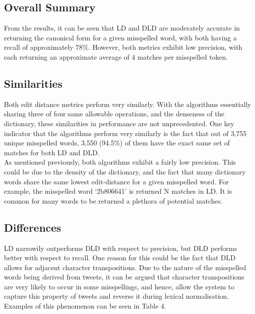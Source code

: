 \documentclass[11pt]{article}
\begin{document}


\subsection{Overall Summary}
From the results, it can be seen that LD and DLD are moderately accurate in returning the canonical form for a given misspelled word, with both having a recall of approximately 78\%. However, both metrics exhibit low precision, with each returning an approximate average of 4 matches per misspelled token.


\subsection{Similarities}
Both edit distance metrics perform very similarly. With the algorithms essentially sharing three of four same allowable operations, and the denseness of the dictionary, these similarities in performance are not unprecedented. One key indicator that the algorithms perform very similarly is the fact that out of 3,755 unique misspelled words, 3,550 (94.5\%) of them have the exact same set of matches for both LD and DLD.
\\

As mentioned previously, both algorithms exhibit a fairly low precision. This could be due to the density of the dictionary, and the fact that many dictionary words share the same lowest edit-distance for a given misspelled word. For example, the misspelled word `2b806641' is returned N matches in LD. It is common for many words to be returned a plethora of potential matches.



\subsection{Differences}

LD narrowily outperforms DLD with respect to precision, but DLD performs better with respect to recall. One reason for this could be the fact that  DLD allows for adjacent character transpositions. Due to the nature of the misspelled words being derived from tweets, it can be argued that character transpositions are very likely to occur in some misspellings, and hence, allow the system to capture this property of tweets and reverse it during lexical normalisation. Examples of this phenomenon can be seen in Table 4.
\\
\end{document}
